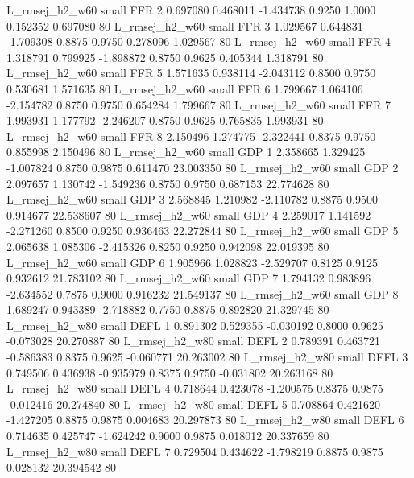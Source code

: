 L_rmsej_h2_w60      small      FFR                 2 0.697080 0.468011 -1.434738 0.9250 1.0000  0.152352    0.697080 80
L_rmsej_h2_w60      small      FFR                 3 1.029567 0.644831 -1.709308 0.8875 0.9750  0.278096    1.029567 80
L_rmsej_h2_w60      small      FFR                 4 1.318791 0.799925 -1.898872 0.8750 0.9625  0.405344    1.318791 80
L_rmsej_h2_w60      small      FFR                 5 1.571635 0.938114 -2.043112 0.8500 0.9750  0.530681    1.571635 80
L_rmsej_h2_w60      small      FFR                 6 1.799667 1.064106 -2.154782 0.8750 0.9750  0.654284    1.799667 80
L_rmsej_h2_w60      small      FFR                 7 1.993931 1.177792 -2.246207 0.8750 0.9625  0.765835    1.993931 80
L_rmsej_h2_w60      small      FFR                 8 2.150496 1.274775 -2.322441 0.8375 0.9750  0.855998    2.150496 80
L_rmsej_h2_w60      small      GDP                 1 2.358665 1.329425 -1.007824 0.8750 0.9875  0.611470   23.003350 80
L_rmsej_h2_w60      small      GDP                 2 2.097657 1.130742 -1.549236 0.8750 0.9750  0.687153   22.774628 80
L_rmsej_h2_w60      small      GDP                 3 2.568845 1.210982 -2.110782 0.8875 0.9500  0.914677   22.538607 80
L_rmsej_h2_w60      small      GDP                 4 2.259017 1.141592 -2.271260 0.8500 0.9250  0.936463   22.272844 80
L_rmsej_h2_w60      small      GDP                 5 2.065638 1.085306 -2.415326 0.8250 0.9250  0.942098   22.019395 80
L_rmsej_h2_w60      small      GDP                 6 1.905966 1.028823 -2.529707 0.8125 0.9125  0.932612   21.783102 80
L_rmsej_h2_w60      small      GDP                 7 1.794132 0.983896 -2.634552 0.7875 0.9000  0.916232   21.549137 80
L_rmsej_h2_w60      small      GDP                 8 1.689247 0.943389 -2.718882 0.7750 0.8875  0.892820   21.329745 80
L_rmsej_h2_w80      small     DEFL                 1 0.891302 0.529355 -0.030192 0.8000 0.9625 -0.073028   20.270887 80
L_rmsej_h2_w80      small     DEFL                 2 0.789391 0.463721 -0.586383 0.8375 0.9625 -0.060771   20.263002 80
L_rmsej_h2_w80      small     DEFL                 3 0.749506 0.436938 -0.935979 0.8375 0.9750 -0.031802   20.263168 80
L_rmsej_h2_w80      small     DEFL                 4 0.718644 0.423078 -1.200575 0.8375 0.9875 -0.012416   20.274840 80
L_rmsej_h2_w80      small     DEFL                 5 0.708864 0.421620 -1.427205 0.8875 0.9875  0.004683   20.297873 80
L_rmsej_h2_w80      small     DEFL                 6 0.714635 0.425747 -1.624242 0.9000 0.9875  0.018012   20.337659 80
L_rmsej_h2_w80      small     DEFL                 7 0.729504 0.434622 -1.798219 0.8875 0.9875  0.028132   20.394542 80
